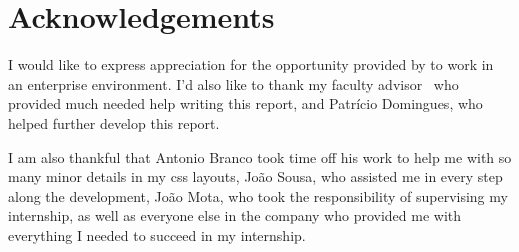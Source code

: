


% 
% 
% 

\begingroup
\let\clearpage\relax
\let\cleardoublepage\relax
\let\cleardoublepage\relax
\chapter*{Acknowledgements}

I would like to express appreciation for the opportunity provided by \company to work
in an enterprise environment. I'd also like to thank my faculty advisor \myProf\,
who provided much needed help writing this report, and Patrício Domingues, who helped further develop this report.

I am also thankful that Antonio Branco took time off his work to help me with so many minor details in my \acrshort{css}
layouts, João Sousa, who assisted me in every step along the development, João Mota, who took the responsibility of supervising my internship,
as well as everyone else in the company who provided me with everything I needed to succeed in my internship.\\



\endgroup



